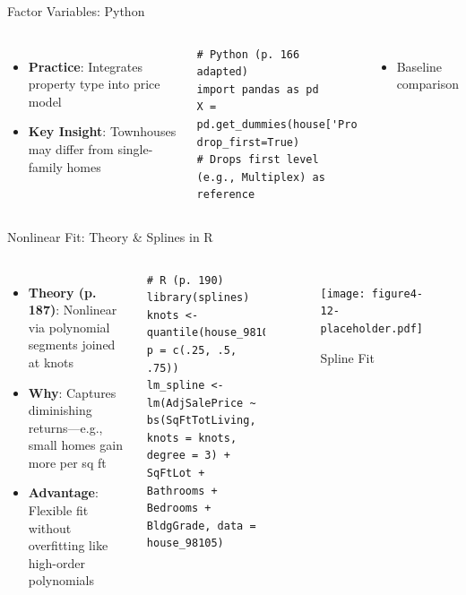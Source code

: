 \documentclass{beamer}
\begin{document}
	\begin{frame}[fragile]{Factor Variables: Python}
		\lstset{language=Python}
		\begin{columns}
			\begin{itemize}
				\item \textbf{Practice}: Integrates property type into price model
				\item \textbf{Key Insight}: Townhouses may differ from single-family homes
			\end{itemize}
			\begin{lstlisting}
# Python (p. 166 adapted)
import pandas as pd
X = pd.get_dummies(house['PropertyType'], drop_first=True)
# Drops first level (e.g., Multiplex) as reference
			\end{lstlisting}
			\begin{itemize}
				\item Baseline comparison
			\end{itemize}
		\end{columns}
	\end{frame}
	
	\begin{frame}[fragile]{Nonlinear Fit: Theory \& Splines in R}
		\begin{columns}
			\column{0.6\textwidth}
			\begin{itemize}
				\item \textbf{Theory (p. 187)}: Nonlinear via polynomial segments joined at knots
				\item \textbf{Why}: Captures diminishing returns—e.g., small homes gain more per sq ft
				\item \textbf{Advantage}: Flexible fit without overfitting like high-order polynomials
			\end{itemize}
			\begin{lstlisting}
# R (p. 190)
library(splines)
knots <- quantile(house_98105$SqFtTotLiving, p = c(.25, .5, .75))
lm_spline <- lm(AdjSalePrice ~ bs(SqFtTotLiving, knots = knots, degree = 3) +
SqFtLot + Bathrooms + Bedrooms + BldgGrade, data = house_98105)
			\end{lstlisting}
			\column{0.4\textwidth}
			\begin{figure}
				\texttt{[image: figure4-12-placeholder.pdf]}
				\caption{Spline Fit}
			\end{figure}
		\end{columns}
	\end{frame}
	
\end{document}
